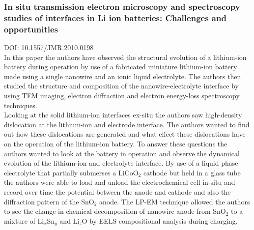 \documentclass[a4paper]{scrartcl}
\begin{document}
\subsubsection*{In situ transmission electron microscopy and spectroscopy
studies of interfaces in Li ion batteries: Challenges and
opportunities}
{\color{gray}\footnotesize DOI: 10.1557/JMR.2010.0198}\\
In this paper the authors have observed the structural evolution of a lithium-ion battery during operation by use of a fabricated miniature lithium-ion battery made using a single nanowire and an ionic liquid electrolyte. The authors then studied the structure and composition of the nanowire-electrolyte interface by using TEM imaging, electron diffraction and electron energy-loss spectroscopy techniques.\\
Looking at the solid lithium-ion interfaces ex-situ the authors saw high-density dislocation at the lithium-ion and electrode interface. The authors wanted to find out how these dislocations are generated and what effect these dislocations have on the operation of the lithium-ion battery. To answer these questions the authors wanted to look at the battery in operation and observe the dynamical evolution of the lithium-ion and electrolyte interface. By use of a liquid phase electrolyte that partially submerses a LiCoO$_2$ cathode but held in a glass tube the authors were able to load and unload the electrochemical cell in-situ and record over time the potential between the anode and cathode and also the diffraction pattern of the SnO$_2$ anode. The LP-EM technique allowed the authors to see the change in chemical decomposition of nanowire anode from SnO$_2$ to a mixture of Li$_x$Sn$_y$ and Li$_z$O by EELS compositional analysis during charging.
\end{document}
